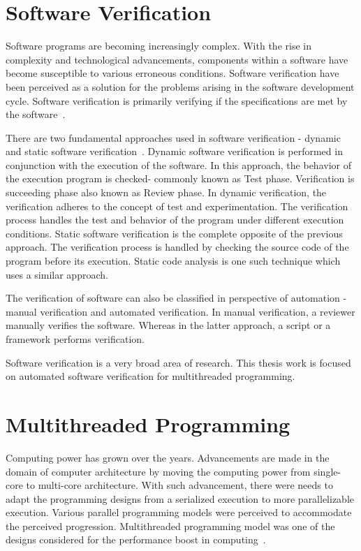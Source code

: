 \section{Software Verification}

Software programs are becoming increasingly complex. 
With the rise in complexity and technological advancements, components within a software have become susceptible to various erroneous conditions. 
Software verification have been perceived as a solution for the problems arising in the software development cycle. 
Software verification is primarily verifying if the specifications are met by the software~\citep{ghezzi2002fundamentals}.

There are two fundamental approaches used in software verification - dynamic and static software verification~\citep{ghezzi2002fundamentals}. 
Dynamic software verification is performed in conjunction with the execution of the software. 
In this approach, the behavior of the execution program is checked- commonly known as Test phase. 
Verification is succeeding phase also known as Review phase. 
In dynamic verification, the verification adheres to the concept of test and experimentation. 
The verification process handles the test and behavior of the program under different execution conditions. 
Static software verification is the complete opposite of the previous approach. 
The verification process is handled by checking the source code of the program before its execution. 
Static code analysis is one such technique which uses a similar approach. 

The verification of software can also be classified in perspective of automation - manual verification and automated verification. 
In manual verification, a reviewer manually verifies the software. 
Whereas in the latter approach, a script or a framework performs  verification. 

Software verification is a very broad area of research. 
This thesis work is focused on automated software verification for multithreaded programming. 

\section{Multithreaded Programming \label{multi_thread}}

Computing power has grown over the years. 
Advancements are made in the domain of computer architecture by moving the computing power from single-core to multi-core architecture. 
With such advancement, there were needs to adapt the programming designs from a serialized execution to more parallelizable execution. 
Various parallel programming models were perceived to accommodate the perceived progression. 
Multithreaded programming model was one of the designs considered for the performance boost in computing~\citep{carver2005modern}. 

